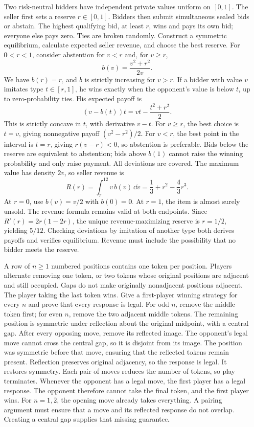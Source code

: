 Two risk-neutral bidders have independent private values uniform on $[0,1]$. The seller first sets a reserve $r\in[0,1]$. Bidders then submit simultaneous sealed bids or abstain. The highest qualifying bid, at least $r$, wins and pays its own bid; everyone else pays zero. Ties are broken randomly. Construct a symmetric equilibrium, calculate expected seller revenue, and choose the best reserve.
\solution For $0<r<1$, consider abstention for $v<r$ and, for $v\ge r$,
\[
 b(v)=\frac{v^2+r^2}{2v}.
\]
We have $b(r)=r$, and $b$ is strictly increasing for $v>r$. If a bidder with value $v$ imitates type $t\in[r,1]$, he wins exactly when the opponent's value is below $t$, up to zero-probability ties. His expected payoff is
\[
 (v-b(t))t=vt-\frac{t^2+r^2}{2}.
\]
This is strictly concave in $t$, with derivative $v-t$. For $v\ge r$, the best choice is $t=v$, giving nonnegative payoff $(v^2-r^2)/2$. For $v<r$, the best point in the interval is $t=r$, giving $r(v-r)<0$, so abstention is preferable. Bids below the reserve are equivalent to abstention; bids above $b(1)$ cannot raise the winning probability and only raise payment. All deviations are covered.
The maximum value has density $2v$, so seller revenue is
\[
 R(r)=\int_r^12v\,b(v)\,\dd v
 =\frac13+r^2-\frac43r^3.
\]
At $r=0$, use $b(v)=v/2$ with $b(0)=0$. At $r=1$, the item is almost surely unsold. The revenue formula remains valid at both endpoints. Since $R'(r)=2r(1-2r)$, the unique revenue-maximizing reserve is $r=1/2$, yielding $5/12$.
\insight Checking deviations by imitation of another type both derives payoffs and verifies equilibrium. Revenue must include the possibility that no bidder meets the reserve.

A row of $n\ge1$ numbered positions contains one token per position. Players alternate removing one token, or two tokens whose original positions are adjacent and still occupied. Gaps do not make originally nonadjacent positions adjacent. The player taking the last token wins. Give a first-player winning strategy for every $n$ and prove that every response is legal.
\solution For odd $n$, remove the middle token first; for even $n$, remove the two adjacent middle tokens. The remaining position is symmetric under reflection about the original midpoint, with a central gap.
After every opposing move, remove its reflected image. The opponent's legal move cannot cross the central gap, so it is disjoint from its image. The position was symmetric before that move, ensuring that the reflected tokens remain present. Reflection preserves original adjacency, so the response is legal. It restores symmetry.
Each pair of moves reduces the number of tokens, so play terminates. Whenever the opponent has a legal move, the first player has a legal response. The opponent therefore cannot take the final token, and the first player wins. For $n=1,2$, the opening move already takes everything.
\insight A pairing argument must ensure that a move and its reflected response do not overlap. Creating a central gap supplies that missing guarantee.

